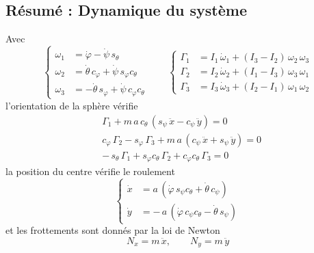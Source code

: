 \subsection{Résumé : Dynamique du système}
\begin{theoreme}
    Avec
    \[
        \left\{
        \begin{aligned}
            \omega_1 &= \dot\varphi - \dot\psi\,s_\theta\\
            \omega_2 &= \dot\theta\,c_\varphi
                + \dot\psi\,s_\varphi c_\theta\\
            \omega_3 &= -\dot\theta\,s_\varphi
                + \dot\psi\,c_\varphi c_\theta
        \end{aligned}
        \right.
        \qquad
        \left\{
        \begin{aligned}
            \Gamma_1 &= I_1\,\dot\omega_1
                + (I_3 - I_2)\,\omega_2\,\omega_3\\
            \Gamma_2 &= I_2\,\dot\omega_2
                + (I_1 - I_3)\,\omega_3\,\omega_1\\
            \Gamma_3 &= I_3\,\dot\omega_3
                + (I_2 - I_1)\,\omega_1\,\omega_2
        \end{aligned}
        \right.
    \]
    l'orientation de la sphère vérifie
    \begin{align*}
        &\Gamma_1 + m\,a\,c_\theta\,(s_\psi\,\ddot x - c_\psi\,\ddot y)
            = 0\\
        &c_\varphi\,\Gamma_2 - s_\varphi\,\Gamma_3
            + m\,a\,(c_\psi\,\ddot x + s_\psi\,\ddot y) = 0\\
        &-\,s_\theta\,\Gamma_1 + s_\varphi c_\theta\,\Gamma_2
            + c_\varphi c_\theta\,\Gamma_3 = 0
    \end{align*}
    la position du centre vérifie le roulement
    \[
        \left\{
        \begin{aligned}
            \dot x &= a\,(\dot\varphi\,s_\psi c_\theta
                + \dot\theta\,c_\psi)\\
            \dot y &= -\,a\,(\dot\varphi\,c_\psi c_\theta
                - \dot\theta\,s_\psi)
        \end{aligned}
        \right.
    \]
    et les frottements sont donnés par la loi de Newton
    \[
        N_x = m\,\ddot x,
        \qquad
        N_y = m\,\ddot y
    \]
\end{theoreme}

